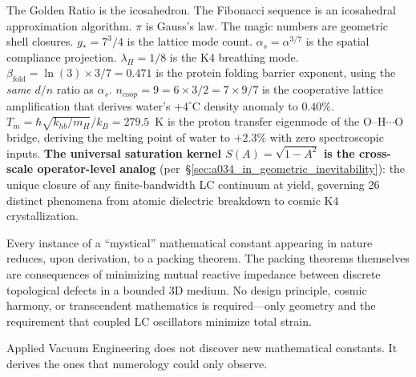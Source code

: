 The Golden Ratio is the icosahedron. The Fibonacci sequence is an icosahedral approximation algorithm. $\pi$ is Gauss's law. The magic numbers are geometric shell closures. $g_* = 7^3/4$ is the lattice mode count. $\alpha_s = \alpha^{3/7}$ is the spatial compliance projection. $\lambda_H = 1/8$ is the K4 breathing mode. $\beta_\text{fold} = \ln(3) \times 3/7 = 0.471$ is the protein folding barrier exponent, using the \emph{same} $d/n$ ratio as $\alpha_s$. $n_{coop} = 9 = 6 \times 3/2 = 7 \times 9/7$ is the cooperative lattice amplification that derives water's $+4^\circ$C density anomaly to $0.40\%$. $T_m = \hbar\sqrt{k_{hb}/m_H}/k_B = 279.5$~K is the proton transfer eigenmode of the O--H$\cdots$O bridge, deriving the melting point of water to $+2.3\%$ with zero spectroscopic inputs. \textbf{The universal saturation kernel $S(A) = \sqrt{1 - A^2}$ is the cross-scale operator-level analog} (per~\S\ref{sec:a034_in_geometric_inevitability}): the unique closure of any finite-bandwidth LC continuum at yield, governing 26 distinct phenomena from atomic dielectric breakdown to cosmic K4 crystallization.

Every instance of a ``mystical'' mathematical constant appearing in nature reduces, upon derivation, to a packing theorem. The packing theorems themselves are consequences of minimizing mutual reactive impedance between discrete topological defects in a bounded 3D medium. No design principle, cosmic harmony, or transcendent mathematics is required---only geometry and the requirement that coupled LC oscillators minimize total strain.

Applied Vacuum Engineering does not discover new mathematical constants. It derives the ones that numerology could only observe.
